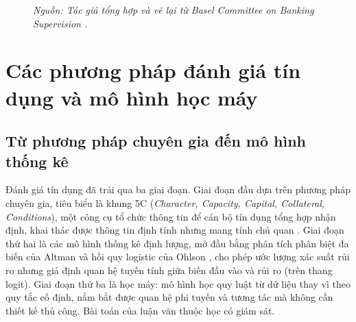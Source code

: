 \begin{figure}[H]
\centering
{}
\caption{Các cấu phần của tổn thất kỳ vọng trong rủi ro tín dụng}
\label{fig:el-components}
\caption*{\textit{Nguồn: Tác giả tổng hợp và vẽ lại từ Basel Committee on Banking Supervision \cite{basel_framework}.}}
\end{figure}

\section{Các phương pháp đánh giá tín dụng và mô hình học máy}
\label{sec:ch2-models}

\subsection{Từ phương pháp chuyên gia đến mô hình thống kê}
\label{sec:ch1-history}

Đánh giá tín dụng đã trải qua ba giai đoạn. Giai đoạn đầu dựa trên phương pháp chuyên gia, tiêu biểu là khung 5C (\textit{Character, Capacity, Capital, Collateral, Conditions}), một công cụ tổ chức thông tin để cán bộ tín dụng tổng hợp nhận định, khai thác được thông tin định tính nhưng mang tính chủ quan \cite{hand1997statistical,thomas2000survey}. Giai đoạn thứ hai là các mô hình thống kê định lượng, mở đầu bằng phân tích phân biệt đa biến của Altman \cite{altman1968financial} và hồi quy logistic của Ohlson \cite{ohlson1980financial}, cho phép ước lượng xác suất rủi ro nhưng giả định quan hệ tuyến tính giữa biến đầu vào và rủi ro (trên thang logit). Giai đoạn thứ ba là học máy: mô hình học quy luật từ dữ liệu thay vì theo quy tắc cố định, nắm bắt được quan hệ phi tuyến và tương tác mà không cần thiết kế thủ công. Bài toán của luận văn thuộc học có giám sát.

